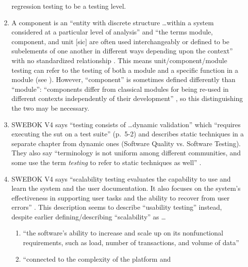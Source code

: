 \begin{enumerate}
            regression testing to be a testing level.
      \item A component is an ``entity with discrete structure \dots within a
            system considered at a particular level of analysis''
            \citep{ISO_IEC2023b} and ``the terms module, component, and unit
                  [sic] are often used interchangeably or defined to be subelements
            of one another in different ways depending upon the context'' with
            no standardized relationship \citep[p.~82]{IEEE2017}. This means
            unit/component/module testing can refer to the testing of both a
            module and a specific function in a module (see ).
            However, ``component'' is sometimes defined differently than
            ``module'': ``components differ from classical modules for being
            re-used in different contexts independently of their development''
            \citep[p.~107]{BaresiAndPezzè2006}, so this distinguishing the two
            may be necessary.
      \item SWEBOK V4 says ``testing consists of \dots dynamic validation''
            \citep[p.~5-1]{SWEBOK2024} which ``requires executing the \acs{sut}
            on a test
            suite''  (p.~5-2) and describes static techniques in
            a separate chapter from dynamic ones (Software Quality vs. Software
            Testing). They also say ``terminology is not uniform among different
            communities, and some use the term \emph{testing} to refer to static
            techniques as well'' \citep[p.~5-2]{SWEBOK2024}.
      \item SWEBOK V4 says ``scalability testing evaluates the capability to
            use and learn the system and the user documentation. It also focuses
            on the system's effectiveness in supporting user tasks and the
            ability to recover from user errors'' \citep[p.~5-9]{SWEBOK2024}.
            This description seems to describe ``usability testing'' instead,
            despite earlier defining/describing ``scalability'' as \ldots
            \begin{enumerate}
                  \item ``the software's ability to increase and scale up on its
                        nonfunctional requirements, such as load, number of
                        transactions, and volume of data'' \citep[p.~5-5]{SWEBOK2024}
                  \item ``connected to the complexity of the platform and

\end{enumerate}
\end{enumerate}
